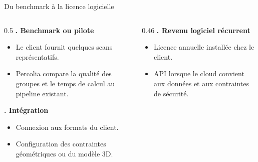 \documentclass[A4,svgnames,10pt,aspectratio=169,usepdftitle=false]{beamer}
\begin{document}
\begin{frame}{Du benchmark à la licence logicielle}
    \begin{columns}[T]
        \begin{column}{0.5\textwidth}
            \textbf{. Benchmark ou pilote}
            \begin{itemize}
                \item Le client fournit quelques scans représentatifs.
                \item Percolia compare la qualité des groupes et le temps de calcul au pipeline existant.
            \end{itemize}

            \vspace{0.25cm}
            \textbf{. Intégration}
            \begin{itemize}
                \item Connexion aux formats du client.
                \item Configuration des contraintes géométriques ou du modèle 3D.
            \end{itemize}
        \end{column}

        \begin{column}{0.46\textwidth}
            \textbf{. Revenu logiciel récurrent}
            \begin{itemize}
                \item Licence annuelle installée chez le client.
                \item API lorsque le cloud convient aux données et aux contraintes de sécurité.
            \end{itemize}
        \end{column}
    \end{columns}
\end{frame}
\end{document}
